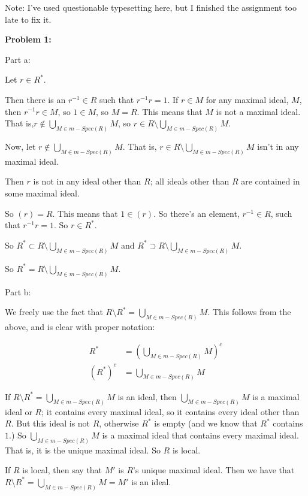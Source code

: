 \documentclass[a4paper,12pt]{article}
\newcommand{\tab}{\hspace{4mm}} %
\newcommand{\shunt}{\vspace{20mm}}
\begin{document}
Note: I've used questionable typesetting here, but I finished the assignment too late to fix it.

{\bf Problem 1:}

Part a:

Let $r \in R^*$.

\tab Then there is an $r^{-1} \in R$ such that $r^{-1}r = 1$. If $r \in M$ for any maximal ideal, $M$, then $r^{-1}r \in M$, so $1 \in M$, so $M = R$. This means that $M$ is not a maximal ideal. That is,$r \notin \bigcup\limits_{M \in m-Spec(R)} M$, so $r \in R \setminus \bigcup\limits_{M \in m-Spec(R)} M$.

Now, let $r \notin \bigcup\limits_{M \in m-Spec(R)} M$. That is, $r \in R \setminus \bigcup\limits_{M \in m-Spec(R)} M$ isn't in any maximal ideal.

\tab Then $r$ is not in any ideal other than $R$; all ideals other than $R$ are contained in some maximal ideal.

\tab So $(r) = R$. This means that $1 \in (r)$. So there's an element, $r^{-1} \in R$, such that $r^{-1}r = 1$. So $r \in R^*$.

So $R^* \subset R \setminus \bigcup\limits_{M \in m-Spec(R)} M$ and $R^* \supset R \setminus \bigcup\limits_{M \in m-Spec(R)} M$.

So $R^* = R \setminus \bigcup\limits_{M \in m-Spec(R)} M$.

\shunt

Part b:

We freely use the fact that $R \setminus R^* = \bigcup\limits_{M \in m-Spec(R)} M$. This follows from the above, and is clear with proper notation:

\begin{align*}
R^* &= \left(\bigcup\limits_{M \in m-Spec(R)} M\right)^c \\
(R^*)^c &= \bigcup\limits_{M \in m-Spec(R)} M
\end{align*}

If $R \setminus R^* = \bigcup\limits_{M \in m-Spec(R)} M$ is an ideal, then $\bigcup\limits_{M \in m-Spec(R)} M$ is a maximal ideal or $R$; it contains every maximal ideal, so it contains every ideal other than $R$. But this ideal is not $R$, otherwise $R^*$ is empty (and we know that $R^*$ contains $1$.) So $\bigcup\limits_{M \in m-Spec(R)} M$ is a maximal ideal that contains every maximal ideal. That is, it is the unique maximal ideal. So $R$ is local.

If $R$ is local, then say that $M'$ is $R$'s unique maximal ideal. Then we have that $R \setminus R^* = \bigcup\limits_{M \in m-Spec(R)} M = M'$ is an ideal. 
\end{document}
